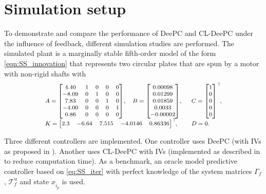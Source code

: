 \section{Simulation setup}
To demonstrate and compare the performance of \ac{DeePC} and \ac{CL-DeePC} under the influence of feedback, different simulation studies are performed. The simulated plant is a marginally stable fifth-order 
model of the form \eqref{eqn:SS_innovation} that represents two circular plates that are spun by a motor with non-rigid shafts with \citep{Favoreel1999b}
\begin{align}\label{eq:SysFavoreel}
\scriptsize
\begin{array}{lll}
    A = \begin{bmatrix}
        4.40 & 1 & 0 & 0 & 0\\
       -8.09 & 0 & 1 & 0 & 0\\
        7.83 & 0 & 0 & 1 & 0\\
       -4.00 & 0 & 0 & 0 & 1\\
        0.86 & 0 & 0 & 0 & 0
    \end{bmatrix}\!,&
    B = \begin{bmatrix}
        0.00098\\
        0.01299\\
        0.01859\\
        0.0033\\
       -0.00002
    \end{bmatrix}\!,&C = \begin{bmatrix}
        1 \\ 0 \\ 0\\ 0\\ 0
    \end{bmatrix}^\top\mkern-7mu,\\
    K = \begin{bmatrix}
        2.3 & -6.64 & 7.515 & -4.0146 & 0.86336
    \end{bmatrix}^\top\mkern-7mu,\span
    &D=0.
\end{array}
\end{align}

Three different controllers are implemented. One controller uses \ac{DeePC} (with \ac{IVs} as proposed in \cite{vanWingerden2022}). Another uses \ac{CL-DeePC} with \ac{IVs} (implemented as described in  to reduce computation time). As a benchmark, an oracle model predictive controller based on \eqref{eq:SS_iter} with perfect knowledge of the system matrices $\Gamma_f$, $\mathcal{T}_f^\mathrm{u}$ and state $x_{\hat{i}_p}$ is used.

